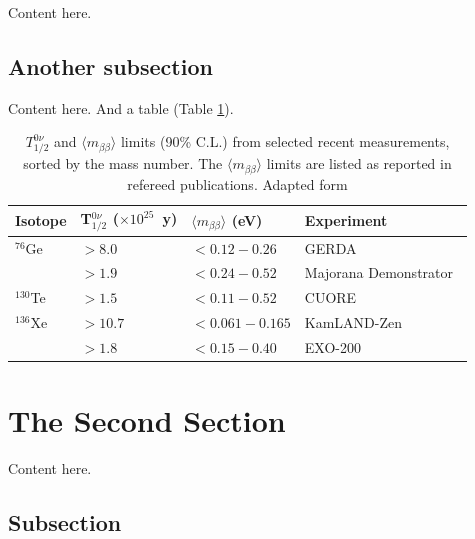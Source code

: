 Content here.

\subsection{Another subsection}

Content here. And a table (Table \ref{tbl:curLimit}). 

\begin{table}
\caption{\label{tbl:curLimit} $T_{1/2}^{0\nu}$ and $\langle m_{\beta\beta} \rangle$ limits (90\% C.L.) from selected recent 
measurements, sorted by the mass number. The $\langle m_{\beta\beta} \rangle$ limits are listed as reported in 
refereed publications. Adapted form \cite{Dolinski:2019nrj} }
\begin{center} 
\begin{tabular}{llll} \\ \hline\hline
Isotope           &  T$_{1/2}^{0\nu}$ ($\times 10^{25}$~y)                       & $\langle m_{\beta\beta}\rangle$ (eV)     &  Experiment\\ \hline
$^{76}$Ge         &  $>8.0$                       &  $<0.12-0.26$                          &  GERDA~\cite{Agostini:2018tnm} \\
                      &   $>1.9$                       &  $<0.24-0.52$                     &  {\sc Majorana Demonstrator}~\cite{Aalseth:2017btx}  \\
$^{130}$Te         &  $>1.5$                       &  $<0.11-0.52$                       &  CUORE~\cite{Alduino:2017ehq}\\
$^{136}$Xe      &  $>10.7$                       &  $<0.061-0.165$                       &  KamLAND-Zen~\cite{KamLAND-Zen:2016pfg} \\ 
    &  $>1.8$                       &  $<0.15-0.40 $                       &  EXO-200~\cite{Albert:2017owj} \\  \hline
\end{tabular}
\end{center}
\end{table}

\section{The Second Section}

Content here.

\subsection{Subsection}

